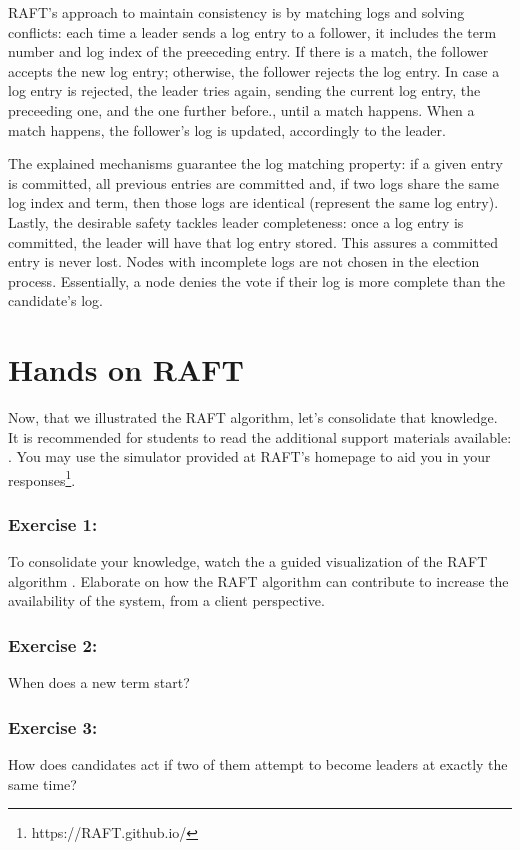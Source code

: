 \documentclass[12pt,a4paper]{article}
\begin{document}
RAFT's approach to maintain consistency is by matching logs and solving conflicts: each time a leader sends a log entry to a follower, it includes the term number and log index of the preeceding entry. If there is a match, the follower accepts the new log entry; otherwise, the follower rejects the log entry. In case a log entry is rejected, the leader tries again, sending the current log entry, the preceeding one, and the one further before., until a match happens. When a match happens, the follower's log is updated, accordingly to the leader.


The explained mechanisms guarantee the log matching property: if a given entry is committed, all previous entries are committed and, if two logs share the same log index and term, then those logs are identical (represent the same log entry). Lastly, the desirable safety tackles leader completeness: once a log entry is committed, the leader will have that log entry stored. This assures a committed entry is never lost. Nodes with incomplete logs are not chosen in the election process. Essentially, a node denies the vote if their log is more complete than the candidate's log.


\section{Hands on RAFT}
Now, that we illustrated the RAFT algorithm, let's consolidate that knowledge. It is recommended for students to read the additional support materials available: \cite{raft_paper,raft_homepage}. You may use the simulator provided at RAFT's homepage to aid you in your responses\footnote{https://RAFT.github.io/}.


\subsubsection*{Exercise 1:} To consolidate your knowledge, watch the a guided visualization of the RAFT algorithm \cite{raft_viz}. 
Elaborate on how the RAFT algorithm can contribute to increase the availability of the system, from a client perspective.

\subsubsection*{Exercise 2:} When does a new term start? 



\subsubsection*{Exercise 3:} How does candidates act if two of them attempt to become leaders at exactly the same time?
\end{document}
